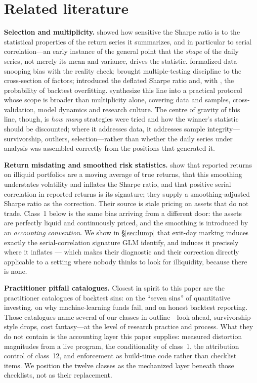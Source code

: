 \documentclass[11pt]{article}
\begin{document}
\section{Related literature}\label{sec:lit}
\textbf{Selection and multiplicity.} \citet{lo2002} showed how sensitive the Sharpe ratio is
to the statistical properties of the return series it summarizes, and in particular to serial
correlation---an early instance of the general point that the \emph{shape} of the daily series,
not merely its mean and variance, drives the statistic. \citet{stw} formalized data-snooping
bias with the reality check; \citet{hl, harvey2016} brought multiple-testing discipline to the
cross-section of factors; \citet{blp2014b, blp} introduced the deflated Sharpe ratio and, with
\citet{pbo}, the probability of backtest overfitting. \citet{ahm} synthesize this line into a
practical protocol whose scope is broader than multiplicity alone, covering data and samples,
cross-validation, model dynamics and research culture. The centre of gravity of this line,
though, is \emph{how many} strategies were tried and how the winner's statistic should be
discounted; where it addresses data, it addresses sample integrity---survivorship, outliers,
selection---rather than whether the daily series under analysis was assembled correctly from
the positions that generated it.

\textbf{Return misdating and smoothed risk statistics.} \citet{glm} show that reported
returns on illiquid portfolios are a moving average of true returns, that this smoothing
understates volatility and inflates the Sharpe ratio, and that positive serial correlation in
reported returns is its signature; they supply a smoothing-adjusted Sharpe ratio as the
correction. Their source is stale pricing on assets that do not trade. Class~1 below is the
same bias arriving from a different door: the assets are perfectly liquid and continuously
priced, and the smoothing is introduced by an \emph{accounting convention}. We show in
\S\ref{sec:lump} that exit-day marking induces exactly the serial-correlation signature GLM
identify, and induces it precisely where it inflates --- which makes their diagnostic and their
correction directly applicable to a setting where nobody thinks to look for illiquidity,
because there is none.

\textbf{Practitioner pitfall catalogues.} Closest in spirit to this paper are the practitioner
catalogues of backtest sins: \citet{luo} on the ``seven sins'' of quantitative investing,
\citet{ldp10} on why machine-learning funds fail, and \citet{fldp} on honest backtest
reporting. Those catalogues name several of our classes in outline---look-ahead, survivorship-
style drops, cost fantasy---at the level of research practice and process. What they do not
contain is the accounting layer this paper supplies: measured distortion magnitudes from a live
program, the conditionality of class~1, the attribution control of class~12, and enforcement as
build-time code rather than checklist items. We position the twelve classes as the mechanized
layer beneath those checklists, not as their replacement.
\end{document}
